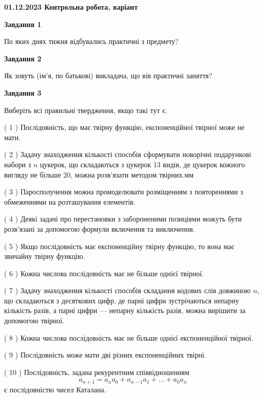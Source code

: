 \documentclass[12pt, ukrainian]{article}
\begin{document}
\begin {large}

\textbf{01.12.2023 Контрольна робота, варіант  }\par


{
{\begin {center}\textbf{Завдання 1}\end {center}}\par
По яких днях тижня відбувались практичні з предмету?\par
{\begin {center}\textbf{Завдання 2}\end {center}}\par
Як зовуть (ім'я, по батькові) викладача, що вів практичні заняття?\par
{\begin {center}\textbf{Завдання 3}\end {center}}\par
Виберіть всі правильні твердження, якщо такі тут є.\par
\vspace{2mm}
( 1 ) Послідовність, що має твірну функцію, експоненційної твірної може не мати.%

( 2 ) Задачу знаходження кількості способів сформувати новорічні подарункові набори з $n$ цукерок, що складаються з цукерок 13 видів, де цукерок кожного вигляду не більше 20, можна розв’язати методом твірних.мм%

( 3 ) Паросполучення можна промоделювати розміщенням з повтореннями з обмеженнями на розташування елементів.%

( 4 ) Деякі задачі про перестановки з забороненими позиціями можуть бути розв’я\-за\-ні за допомогою формули включення та виключення.%

( 5 ) Якщо послідовність має експоненційну твірну функцію, то вона має звичайну твірну функцію.%

( 6 ) Кожна числова послідовність має не більше однієї твірної.%

( 7 ) Задачу знаходження кількості способів складання кодових слів довжиною $n$, що складаються з десяткових цифр, де парні цифри зустрічаються непарну кількість разів, а парні цифри — непарну кількість разів, можна вирішити за допомогою твірної.%

( 8 ) Кожна числова послідовність має не більше однієї  експоненційної твірної.%

( 9 ) Послідовність може мати дві різних експоненційних твірні.%

( 10 ) Послідовність, задана рекурентним співвідношенням $$a_{n+1}=a_{n}a_{0}+a_{n-1}a_{1}+\ldots+a_0a_{n}$$ є послідовністю чисел Каталана.%
}
\end {large}

\vspace{4mm}
\newpage
\end{document}
